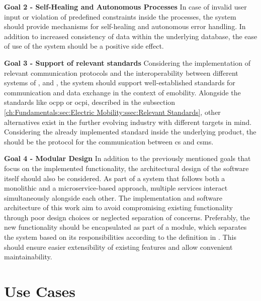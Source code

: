 \noindent \textbf{Goal 2 - Self-Healing and Autonomous Processes} In case of invalid user input or violation of predefined constraints inside the processes, the system should provide mechanisms for self-healing and autonomous error handling. 
In addition to increased consistency of data within the underlying database, the ease of use of the system should be a positive side effect.

\noindent \textbf{Goal 3 - Support of relevant standards} Considering the implementation of relevant communication protocols and the interoperability between different systems of ,  and , the system should support well-established standards for communication and data exchange in the context of \acrshort{emobility}. 
Alongside the standards like \acrshort{ocpp} or \acrshort{ocpi}, described in the subsection \ref{ch:Fundamentals:sec:Electric Mobility:ssec:Relevant Standards}, other alternatives exist in the further evolving industry with different targets in mind. 
Considering the already implemented standard inside the underlying product, the  should be the protocol for the communication between \acrshort{cs} and \acrshort{csms}.

\noindent \textbf{Goal 4 - Modular Design} In addition to the previously mentioned goals that focus on the implemented functionality, the architectural design of the software itself should also be considered. 
As part of a system that follows both a monolithic and a microservice-based approach, multiple services interact simultaneously alongside each other. The implementation and software architecture of this work aim to avoid compromising existing functionality through poor design choices or neglected separation of concerns. 
Preferably, the new functionality should be encapsulated as part of a module, which separates the system based on its responsibilities according to the definition in \cite{clements_documenting_2011}. This should ensure easier extensibility of existing features and allow convenient maintainability.

\section{Use Cases}
\label{ch:Requirements Engineering:sec:Use Cases}

